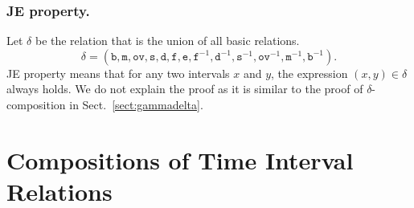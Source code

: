 \documentclass{llncs}
\begin{document}

\subsubsection{JE property.} 
Let $\delta$ be the relation that is  the union of all basic relations. $$\delta = (\texttt{b},\texttt{m},\texttt{ov}, \texttt{s}, \texttt{d}, \texttt{f}, \texttt{e}, \texttt{f}^{-1}, \texttt{d}^{-1}, \texttt{s}^{-1}, \texttt{ov}^{-1}, \texttt{m}^{-1}, \texttt{b}^{-1}).$$ 
JE property means that for any two intervals $x$ and $y$, the expression $(x, y) \in \delta$ always holds. We do not explain the proof as it is similar to the proof of $\delta$-composition in Sect.~\ref{sect:gammadelta}.


%
\section{Compositions of Time Interval Relations}
\label{sect:comp}
\end{document}
